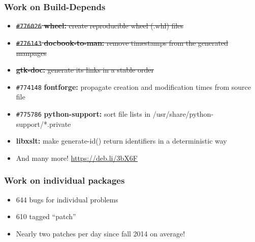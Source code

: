 \documentclass[14pt]{beamer}
\begin{document}
\begin{frame}
 \frametitle{Work on Build-Depends}

 \begin{itemize}\small
  \item \sout{\texttt{\#776026} \textbf{wheel:} create reproducible wheel (.whl) files}
  \item \sout{\texttt{\#776143} \textbf{docbook-to-man:} remove timestamps from the generated manpages}
  \item \sout{\textbf{gtk-doc:} generate its links in a stable order}
  \item \texttt{\#774148} \textbf{fontforge:} propagate creation and modification times from source file
  \item \texttt{\#775786} \textbf{python-support:} sort file lists in /usr/share/python-support/*.private
  \item \textbf{libxslt:} make generate-id() return identifiers in a deterministic way
  \item And many more! \url{https://deb.li/3bX6F}
 \end{itemize}
\end{frame}

\begin{frame}
 \frametitle{Work on individual packages}

 \begin{itemize}
  \item 644 bugs for individual problems
  \item 610 tagged “patch”
  \item Nearly two patches per day since fall 2014 on average!
 \end{itemize}
\end{frame}

\begin{frame}[plain]
\end{frame}
\end{document}
